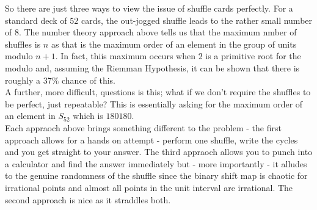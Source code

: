 \documentclass[../Axiomathic.tex]{subfiles}
\begin{document}
So there are just three ways to view the issue of shuffle cards perfectly. For a standard deck of $52$ cards, the out-jogged shuffle leads to the rather small number of 8. The number theory approach above tells us that the maximum nmber of shuffles is $n$ as that is the maximum order of an element in the group of units modulo $n+1$. In fact, thiis maximum occurs when $2$ is a primitive root for the modulo and, assuming the Riemman Hypothesis, it can be shown that there is roughly a $37\%$ chance of this.
\\
A further, more difficult, questions is this; what if we don't require the shuffles to be perfect, just repeatable? This is essentially asking for the maximum order of an element in $S_{52}$ which is $180180$. \\

Each appraoch above brings something different to the problem - the first approach allows for a hands on attempt - perform one shuffle, write the cycles and you get straight to your answer. The third appraoch allows you to punch into a calculator and find the answer immediately but - more importantly - it alludes to the genuine randomness of the shuffle since the binary shift map is chaotic for irrational points and almost all points in the unit interval are irrational. The second approach is nice as it straddles both. 
			

  
\end{document}
